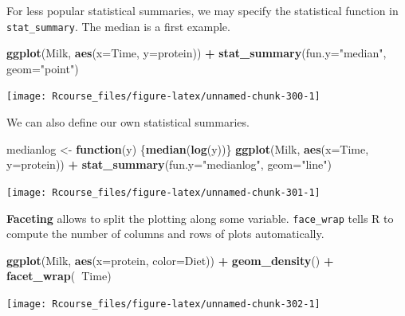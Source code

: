 \documentclass[]{book}
\newenvironment{Shaded}{\begin{snugshade}}{\end{snugshade}}
\newcommand{\ControlFlowTok}[1]{\textcolor[rgb]{0.13,0.29,0.53}{\textbf{#1}}}
\newcommand{\DataTypeTok}[1]{\textcolor[rgb]{0.13,0.29,0.53}{#1}}
\newcommand{\KeywordTok}[1]{\textcolor[rgb]{0.13,0.29,0.53}{\textbf{#1}}}
\newcommand{\NormalTok}[1]{#1}
\newcommand{\OperatorTok}[1]{\textcolor[rgb]{0.81,0.36,0.00}{\textbf{#1}}}
\newcommand{\StringTok}[1]{\textcolor[rgb]{0.31,0.60,0.02}{#1}}
\theoremstyle{definition}
\theoremstyle{definition}
\theoremstyle{definition}
\theoremstyle{remark}
\begin{document}
For less popular statistical summaries, we may specify the statistical function in \texttt{stat\_summary}. The median is a first example.

\begin{Shaded}
\begin{Highlighting}[]
\KeywordTok{ggplot}\NormalTok{(Milk, }\KeywordTok{aes}\NormalTok{(}\DataTypeTok{x=}\NormalTok{Time, }\DataTypeTok{y=}\NormalTok{protein)) }\OperatorTok{+}
\StringTok{  }\KeywordTok{stat_summary}\NormalTok{(}\DataTypeTok{fun.y=}\StringTok{"median"}\NormalTok{, }\DataTypeTok{geom=}\StringTok{"point"}\NormalTok{)}
\end{Highlighting}
\end{Shaded}

\texttt{[image: Rcourse\_files/figure-latex/unnamed-chunk-300-1]}

We can also define our own statistical summaries.

\begin{Shaded}
\begin{Highlighting}[]
\NormalTok{medianlog <-}\StringTok{ }\ControlFlowTok{function}\NormalTok{(y) \{}\KeywordTok{median}\NormalTok{(}\KeywordTok{log}\NormalTok{(y))\}}
\KeywordTok{ggplot}\NormalTok{(Milk, }\KeywordTok{aes}\NormalTok{(}\DataTypeTok{x=}\NormalTok{Time, }\DataTypeTok{y=}\NormalTok{protein)) }\OperatorTok{+}
\StringTok{  }\KeywordTok{stat_summary}\NormalTok{(}\DataTypeTok{fun.y=}\StringTok{"medianlog"}\NormalTok{, }\DataTypeTok{geom=}\StringTok{"line"}\NormalTok{)}
\end{Highlighting}
\end{Shaded}

\texttt{[image: Rcourse\_files/figure-latex/unnamed-chunk-301-1]}

\textbf{Faceting} allows to split the plotting along some variable.
\texttt{face\_wrap} tells R to compute the number of columns and rows of plots automatically.

\begin{Shaded}
\begin{Highlighting}[]
\KeywordTok{ggplot}\NormalTok{(Milk, }\KeywordTok{aes}\NormalTok{(}\DataTypeTok{x=}\NormalTok{protein, }\DataTypeTok{color=}\NormalTok{Diet)) }\OperatorTok{+}
\StringTok{  }\KeywordTok{geom_density}\NormalTok{() }\OperatorTok{+}
\StringTok{  }\KeywordTok{facet_wrap}\NormalTok{(}\OperatorTok{~}\NormalTok{Time)}
\end{Highlighting}
\end{Shaded}

\texttt{[image: Rcourse\_files/figure-latex/unnamed-chunk-302-1]}
\end{document}
